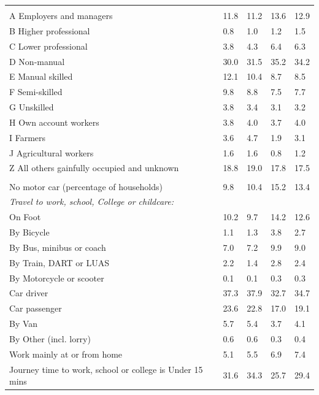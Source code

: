 \documentclass{article}
\begin{document}
\begin{table}[h]
\begin{tabular}{KTTTT}
\hline
    \\ 
    \hline
A Employers and managers & 11.8& 11.2& 13.6& 12.9\\
B Higher professional & 0.8& 1.0& 1.2& 1.5\\
C Lower professional & 3.8& 4.3& 6.4& 6.3\\
D Non-manual & 30.0& 31.5& 35.2& 34.2\\
E Manual skilled & 12.1& 10.4&  8.7&  8.5\\
F Semi-skilled & 9.8& 8.8& 7.5& 7.7\\
G Unskilled & 3.8& 3.4& 3.1& 3.2\\
H Own account workers & 3.8& 4.0& 3.7& 4.0\\
I Farmers & 3.6& 4.7& 1.9& 3.1\\
J Agricultural workers & 1.6& 1.6& 0.8& 1.2\\
Z All others gainfully occupied and unknown & 18.8& 19.0& 17.8& 17.5\\
\hline
{}\hline
    \\ 
    \hline
No motor car (percentage of households) &  9.8& 10.4& 15.2& 
13.4\\
    \hline 
\emph{Travel to work, school, College or childcare:} & & & \\
\quad On Foot & 10.2&  9.7& 14.2& 12.6\\ 
\quad By Bicycle & 1.1& 1.3& 3.8& 2.7\\ 
\quad By Bus, minibus or coach & 7.0& 7.2& 9.9& 9.0\\
\quad By Train, DART or LUAS & 2.2& 1.4& 2.8& 2.4\\
\quad By Motorcycle or scooter & 0.1& 0.1& 0.3& 0.3\\
\quad Car driver & 37.3 & 37.9& 32.7& 34.7\\
\quad Car passenger & 23.6& 22.8& 17.0& 19.1\\
\quad By Van & 5.7& 5.4& 3.7& 4.1\\
\quad By Other (incl. lorry) & 0.6& 0.6& 0.3& 0.4\\
    \hline
Work mainly at or from home & 5.1& 5.5& 6.9& 7.4\\
Journey time to work, school or college is Under 15 mins & 31.6& 34.3& 25.7& 29.4\\

\end{tabular}
\end{table}
\end{document}
